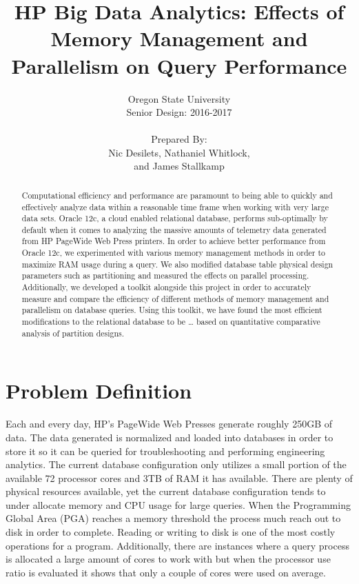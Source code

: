 \documentclass[draftclsnofoot, onecolumn, 10pt]{IEEEtran}
\title{\huge HP Big Data Analytics: Effects of Memory Management and Parallelism on Query Performance}
\author{Oregon State University\\Senior Design: 2016-2017\\\\Prepared By:\\Nic Desilets, Nathaniel Whitlock,\\ and James Stallkamp}
\begin{document}
\begin{titlingpage}
    \maketitle
    
    \begin{abstract}
		Computational efficiency and performance are paramount to being able to quickly
		and effectively analyze data within a reasonable time frame when working with
		very large data sets. Oracle 12c, a cloud enabled relational database, performs
		sub-optimally by default when it comes to analyzing the massive amounts of
		telemetry data generated from HP PageWide Web Press printers. In order to achieve
		better performance from Oracle 12c, we experimented with various memory management
		methods in order to maximize RAM usage during a query. We also modified database
		table physical design parameters such as partitioning and measured the effects on
		parallel processing.  Additionally, we developed a toolkit alongside this project
		in order to accurately measure and compare the efficiency of different methods of
		memory management and parallelism on database queries. Using this toolkit, we have
		found the most efficient modifications to the relational database to be … based
		on quantitative comparative analysis of partition designs.
    \end{abstract}
\end{titlingpage}


\section*{Problem Definition}
Each and every day, HP’s PageWide Web Presses generate roughly 250GB of data.
The data generated is normalized and loaded into databases in order to store
it so it can be queried for troubleshooting and performing engineering analytics.
The current database configuration only utilizes a small portion of the available
72 processor cores and 3TB of RAM it has available. There are plenty of physical
resources available, yet the current database configuration tends to under
allocate memory and CPU usage for large queries. When the Programming Global Area
(PGA) reaches a memory threshold the process much reach out to disk in order to
complete. Reading or writing to disk is one of the most costly operations for a
program. Additionally, there are instances where a query process is allocated a
large amount of cores to work with but when the processor use ratio is evaluated
it shows that only a couple of cores were used on average.
\end{document}
